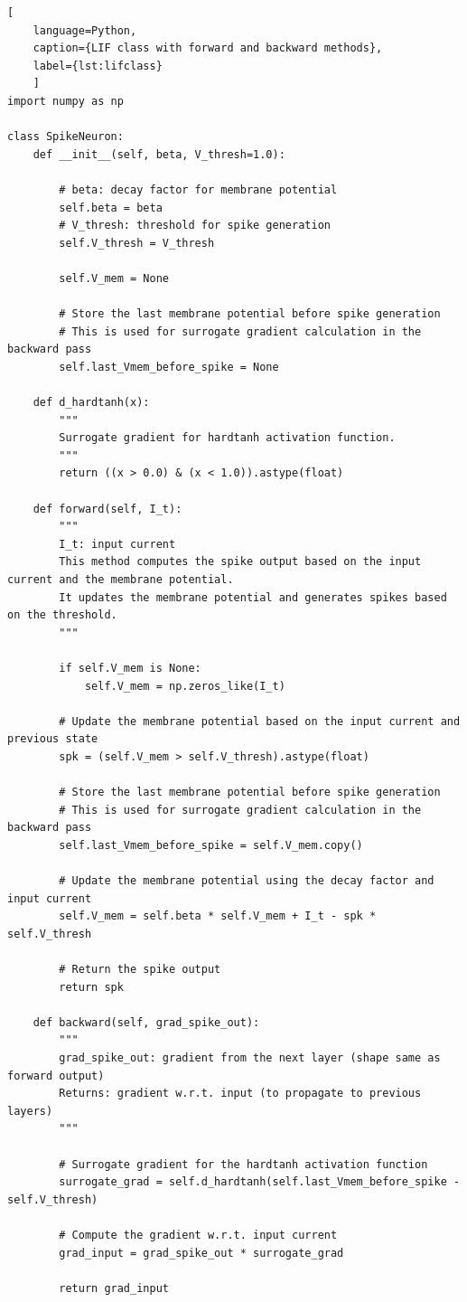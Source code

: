 \begin{lstlisting}[
	language=Python, 
	caption={LIF class with forward and backward methods}, 
	label={lst:lifclass}
	]
import numpy as np

class SpikeNeuron:
	def __init__(self, beta, V_thresh=1.0):
	
		# beta: decay factor for membrane potential
		self.beta = beta
		# V_thresh: threshold for spike generation
		self.V_thresh = V_thresh
	
		self.V_mem = None
	
		# Store the last membrane potential before spike generation
		# This is used for surrogate gradient calculation in the backward pass       
		self.last_Vmem_before_spike = None
	
	def d_hardtanh(x):
		"""
		Surrogate gradient for hardtanh activation function.
		"""
		return ((x > 0.0) & (x < 1.0)).astype(float)
	
	def forward(self, I_t):
		"""
		I_t: input current
		This method computes the spike output based on the input current and the membrane potential.
		It updates the membrane potential and generates spikes based on the threshold.
		"""
		
		if self.V_mem is None:
			self.V_mem = np.zeros_like(I_t)
		
		# Update the membrane potential based on the input current and previous state
		spk = (self.V_mem > self.V_thresh).astype(float)
		
		# Store the last membrane potential before spike generation
		# This is used for surrogate gradient calculation in the backward pass
		self.last_Vmem_before_spike = self.V_mem.copy()
		
		# Update the membrane potential using the decay factor and input current
		self.V_mem = self.beta * self.V_mem + I_t - spk * self.V_thresh
		
		# Return the spike output
		return spk
	
	def backward(self, grad_spike_out):
		"""
		grad_spike_out: gradient from the next layer (shape same as forward output)
		Returns: gradient w.r.t. input (to propagate to previous layers)
		"""
		
		# Surrogate gradient for the hardtanh activation function
		surrogate_grad = self.d_hardtanh(self.last_Vmem_before_spike - self.V_thresh)
		
		# Compute the gradient w.r.t. input current
		grad_input = grad_spike_out * surrogate_grad
		
		return grad_input

\end{lstlisting}